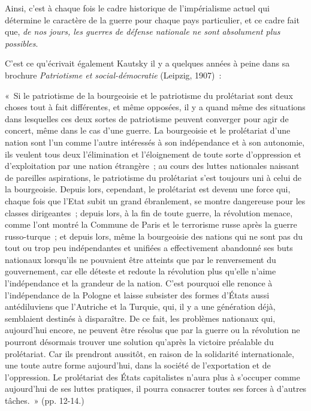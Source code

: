 \documentclass[french,twoside]{book} %
\newenvironment{quoteblock}%
  {\begin{quoting}}
  {\end{quoting}}
\newenvironment{quotebar}{%
    \def\FrameCommand{{\color{rubric!10!}\vrule width 0.5em} \hspace{0.9em}}%
    \def\OuterFrameSep{\itemsep} %
    \MakeFramed {\advance\hsize-\width \FrameRestore}
  }%
  {%
    \endMakeFramed
  }
\renewenvironment{quoteblock}%
  {%
    \savenotes
    \setstretch{0.9}
    \normalfont
    \begin{quotebar}
  }
  {%
    \end{quotebar}
    \spewnotes
  }
\begin{document}
Ainsi, c’est à chaque fois le cadre historique de l’impérialisme actuel qui détermine le caractère de la guerre pour chaque pays particulier, et ce cadre fait que, \emph{de nos jours, les guerres de défense nationale ne sont absolument plus possibles}.\par
C'est ce qu’écrivait également Kautsky il y a quelques années à peine dans sa brochure \emph{Patriotisme et social-démocratie} (Leipzig, 1907) :\par

\begin{quoteblock}
 \noindent « Si le patriotisme de la bourgeoisie et le patriotisme du prolétariat sont deux choses tout à fait différentes, et même opposées, il y a quand même des situations dans lesquelles ces deux sortes de patriotisme peuvent converger pour agir de concert, même dans le cas d’une guerre. La bourgeoisie et le prolétariat d’une nation sont l’un comme l’autre intéressés à son indépendance et à son autonomie, ils veulent tous deux l’élimination et l’éloignement de toute sorte d’oppression et d’exploitation par une nation étrangère ; au cours des luttes nationales naissant de pareilles aspirations, le patriotisme du prolétariat s’est toujours uni à celui de la bourgeoisie. Depuis lors, cependant, le prolétariat est devenu une force qui, chaque fois que l’Etat subit un grand ébranlement, se montre dangereuse pour les classes dirigeantes ; depuis lors, à la fin de toute guerre, la révolution menace, comme l’ont montré la Commune de Paris et le terrorisme russe après la guerre russo-turque ; et depuis lors, même la bourgeoisie des nations qui ne sont pas du tout ou trop peu indépendantes et unifiées a effectivement abandonné ses buts nationaux lorsqu’ils ne pouvaient être atteints que par le renversement du gouvernement, car elle déteste et redoute la révolution plus qu’elle n’aime l’indépendance et la grandeur de la nation. C'est pourquoi elle renonce à l’indépendance de la Pologne et laisse subsister des formes d’États aussi antédiluviens que l’Autriche et la Turquie, qui, il y a une génération déjà, semblaient destinés à disparaître. De ce fait, les problèmes nationaux qui, aujourd’hui encore, ne peuvent être résolus que par la guerre ou la révolution ne pourront désormais trouver une solution qu’après la victoire préalable du prolétariat. Car ils prendront aussitôt, en raison de la solidarité internationale, une toute autre forme aujourd’hui, dans la société de l’exportation et de l’oppression. Le prolétariat des États capitalistes n’aura plus à s’occuper comme aujourd’hui de ses luttes pratiques, il pourra consacrer toutes ses forces à d’autres tâches. » (pp. 12-14.)\par

\end{quoteblock}
\end{document}
